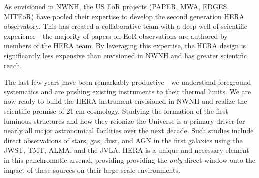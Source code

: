 \documentclass[preprint]{aastex}
\begin{document}
As envisioned in NWNH, the US EoR projects (PAPER, MWA, EDGES, MITEoR) have
pooled their expertise to develop the second generation HERA observatory. This
has created a collaborative team with a deep well of scientific
experience---the majority of papers on EoR observations are authored by members
of the HERA team. By leveraging this expertise, the HERA design is significantly
less expensive than envisioned in 
NWNH and has greater scientific reach.

The last few years have been remarkably productive---we
understand foreground systematics and are pushing 
existing
instruments to their thermal limits. We are now ready to build the HERA
instrument envisioned in NWNH and realize the scientific promise of 21-cm
cosmology.
Studying the formation of the first luminous structures 
and how they reionize the Universe is a primary driver for 
nearly all major astronomical facilities over the next decade.
Such studies include direct 
observations of stars, gas, dust, and AGN in the
first galaxies using the JWST, TMT, ALMA, and the JVLA. HERA is 
a unique and necessary element in this panchromatic arsenal, providing
providing the \emph{only} direct window onto the impact of these sources on 
their large-scale environments.

\clearpage
\setcounter{page}{1}
\thispagestyle{empty}
%
%

%

\end{document}
